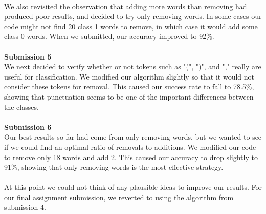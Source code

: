 \documentclass{article}
\begin{document}
\\
We also revisited the observation that adding more words than removing had produced poor results, and decided to try only removing words. In some cases our code might not find 20 class 1 words to remove, in which case it would add some class 0 words. When we submitted, our accuracy improved to 92\%. \\
\\
\textbf{\large Submission 5} \\
We next decided to verify whether or not tokens such as "(", ")", and "," really are useful for classification. We modified our algorithm slightly so that it would not consider these tokens for removal. This caused our success rate to fall to 78.5\%, showing that punctuation seems to be one of the important differences between the classes. \\
\\
\textbf{\large Submission 6} \\
Our best results so far had come from only removing words, but we wanted to see if we could find an optimal ratio of removals to additions. We modified our code to remove only 18 words and add 2. This caused our accuracy to drop slightly to 91\%, showing that only removing words is the most effective strategy. \\
\\
At this point we could not think of any plausible ideas to improve our results. For our final assignment submission, we reverted to using the algorithm from submission 4.

\end{document}
